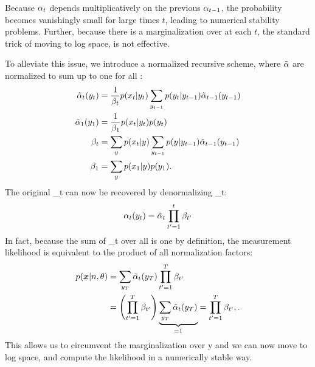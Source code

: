 Because $\alpha_{t}$ depends multiplicatively on the previous $\alpha_{t-1}$,
the probability becomes vanishingly small for large times $t$, leading to
numerical stability problems. Further, because there is a marginalization over
\states at each $t$, the standard trick of moving to log space, is not
effective.

To alleviate this issue, we introduce a normalized recursive scheme, where
$\tilde{\alpha}$ are normalized to sum up to one for all \y{}:
%
\begin{align*}
  \tilde{\alpha}_t(y_{t}) &=
    \frac{1}{\beta_t}
    p(x_{t}|y_{t})
    \sum_{y_{t-1}}
      p(y_{t} | y_{t-1})
      \tilde{\alpha}_{t-1}(y_{t-1})\\
  \tilde{\alpha}_{1}(y_{1}) &=
    \frac{1}{\beta_1}
    p(x_{t}|y_{t})
    p(y_{t})\\
  \beta_t &=
    \sum_{y_{}}
    p(x_{t}|y_{})
    \sum_{y_{t-1}}
      p(y_{} | y_{t-1})
      \tilde{\alpha}_{t-1}(y_{t-1})\\
  \beta_1 &=
    \sum_{y_{}}
    p(x_{1}|y_{})
    p(y_{1})  \text{.}\\
\end{align*}
%
The original \pchain_{t} can now be recovered by denormalizing \pchainnorm_{t}:
%
\begin{equation*}
  \alpha_t(y_{t}) = \tilde{\alpha}_t \prod_{t'=1}^t \beta_{t'}
\end{equation*}
In fact, because the sum of \pchain_{t} over all  is one by definition, the measurement likelihood is equivalent to the product of all normalization factors:
\begin{align*}
  p(\bm{x}|n,\theta)
    &= \sum_{y_{T}} \tilde{\alpha}_{t}(y_{T}) \prod_{t'=1}^T \beta_{t'}\\
    &= \left( \prod_{t'=1}^T \beta_{t'} \right)
      \underbrace{\sum_{y_{T}} \tilde{\alpha}_{t}(y_{T})}_{=1}
    = \prod_{t'=1}^T \beta_{t'} ,\text{.}\\
\end{align*}
This allows us to circumvent the marginalization over y and we can now move to log space, and compute the likelihood in a numerically stable way.
